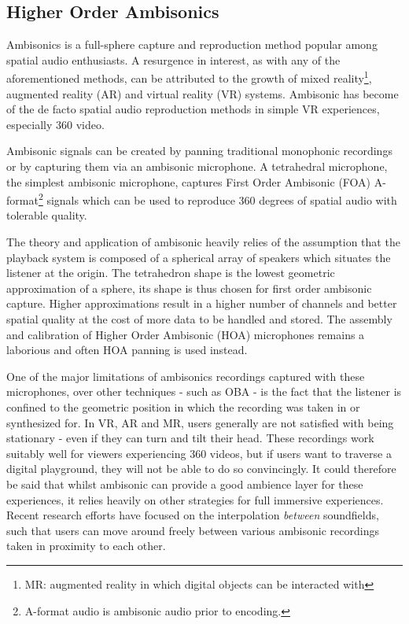 \subsection{Higher Order Ambisonics}
\label{subsec:ambi}

Ambisonics is a full-sphere capture and reproduction method popular among spatial audio enthusiasts. A resurgence in interest, as with any of the aforementioned methods, can be attributed to the growth of mixed reality\footnote{MR: augmented reality in which digital objects can be interacted with}, augmented reality (AR) and virtual reality (VR) systems. Ambisonic has become of the de facto spatial audio reproduction methods in simple VR experiences, especially 360 video. 

Ambisonic signals can be created by panning traditional monophonic recordings or by capturing them via an ambisonic microphone. A tetrahedral microphone, the simplest ambisonic microphone, captures First Order Ambisonic (FOA) A-format\footnote{A-format audio is ambisonic audio prior to encoding.} signals which can be used to reproduce 360 degrees of spatial audio with tolerable quality. 

The theory and application of ambisonic heavily relies of the assumption that the playback system is composed of a spherical array of speakers which situates the listener at the origin. The tetrahedron shape is the lowest geometric approximation of a sphere, its shape is thus chosen for first order ambisonic capture. Higher approximations result in a higher number of channels and better spatial quality at the cost of more data to be handled and stored. The assembly and calibration of Higher Order Ambisonic (HOA) microphones remains a laborious and often HOA panning is used instead.

One of the major limitations of ambisonics recordings captured with these microphones, over other techniques - such as OBA - is the fact that the listener is confined to the geometric position in which the recording was taken in or synthesized for. In VR, AR and MR, users generally are not satisfied with being stationary - even if they can turn and tilt their head. These recordings work suitably well for viewers experiencing 360 videos, but if users want to traverse a digital playground, they will not be able to do so convincingly. It could therefore be said that whilst ambisonic can provide a good ambience layer for these experiences, it relies heavily on other strategies for full immersive experiences. Recent research efforts have focused on the interpolation \textit{between} soundfields, such that users can move around freely between various ambisonic recordings taken in proximity to each other. 

